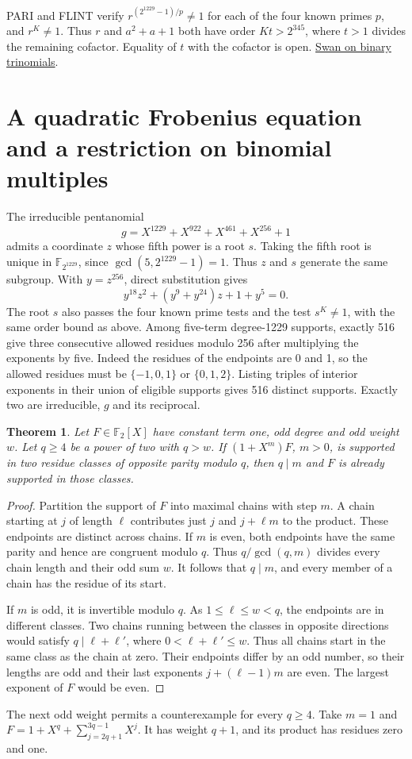 \documentclass[11pt]{article}
\newtheorem{theorem}{Theorem}
\newcommand{\F}{\mathbb F_2}
\begin{document}
PARI and FLINT verify \(r^{(2^{1229}-1)/p}\ne 1\) for each of the
four known primes \(p\), and \(r^K\ne 1\). Thus \(r\) and
\(a^2+a+1\) both have order \(Kt>2^{345}\), where \(t>1\)
divides the remaining cofactor. Equality of \(t\) with the cofactor is open.
\href{https://doi.org/10.2140/pjm.1962.12.1099}{Swan on binary trinomials}.

\section{A quadratic Frobenius equation and a restriction on binomial multiples}
\label{sec:quadratic-frobenius-support}
The irreducible pentanomial
\[
 g=X^{1229}+X^{922}+X^{461}+X^{256}+1
\]
admits a coordinate \(z\) whose fifth power is a root \(s\). Taking
the fifth root is unique in \(\mathbb F_{2^{1229}}\), since
\(\gcd(5,2^{1229}-1)=1\). Thus \(z\) and \(s\) generate the same
subgroup. With \(y=z^{256}\), direct substitution gives
\[
       y^{18}z^2+(y^9+y^{24})z+1+y^5=0 .
\]
The root \(s\) also passes the four known prime tests and the test
\(s^K\ne1\), with the same order bound as above. Among five-term
degree-1229 supports, exactly 516 give three consecutive allowed
residues modulo 256 after multiplying the exponents by five. Indeed
the residues of the endpoints are 0 and 1, so the allowed residues
must be \(\{-1,0,1\}\) or \(\{0,1,2\}\). Listing triples of interior
exponents in their union of eligible supports gives 516 distinct
supports. Exactly two are irreducible, \(g\) and its reciprocal.

\begin{theorem}\label{thm:binomial-two-residues}
Let \(F\in\F[X]\) have constant term one, odd degree and odd weight
\(w\). Let \(q\ge4\) be a power of two with \(q>w\).
If \((1+X^m)F\), \(m>0\), is supported in two residue classes of
opposite parity modulo \(q\), then \(q\mid m\) and \(F\) is already
supported in those classes.
\end{theorem}
\begin{proof}
Partition the support of \(F\) into maximal chains with step \(m\).
A chain starting at \(j\) of length \(\ell\) contributes just \(j\)
and \(j+\ell m\) to the product. These endpoints are distinct
across chains. If \(m\) is even, both endpoints have the same
parity and hence are congruent modulo \(q\). Thus \(q/\gcd(q,m)\)
divides every chain length and their odd sum \(w\). It follows that
\(q\mid m\), and every member of a chain has the residue of its start.

If \(m\) is odd, it is invertible modulo \(q\). As \(1\le\ell\le w<q\),
the endpoints are in different classes. Two chains running between
the classes in opposite directions would satisfy \(q\mid\ell+\ell'\),
where \(0<\ell+\ell'\le w\). Thus all chains start in the same
class as the chain at zero. Their endpoints differ by an odd number,
so their lengths are odd and their last exponents \(j+(\ell-1)m\)
are even. The largest exponent of \(F\) would be even.
\end{proof}
The next odd weight permits a counterexample for every \(q\ge4\).
Take \(m=1\) and \(F=1+X^q+\sum_{j=2q+1}^{3q-1}X^j\).
It has weight \(q+1\), and its product has residues zero and one.
\end{document}

